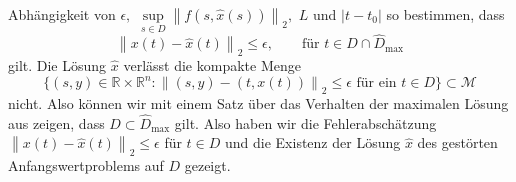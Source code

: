 Abhängigkeit von $\epsilon,$ $\sup\limits_{s \in D}\left\lVert f(s,\hat{x}(s))\right\rVert_2,$  $L$ und $|t-t_0|$ so
bestimmen, dass
\[
    \left\lVert x(t) - \hat{x}(t) \right\rVert_2 \leq \epsilon, \qquad \text{für } t \in D \cap \hat{D}_{\text{max}}
\]
gilt. Die Lösung $\hat{x}$ verlässt die kompakte Menge
\[
    \{(s,y) \in \mathbb{R} \times \mathbb{R}^n: \left\lVert (s,y) - (t,x(t)) \right\rVert_2 \leq \epsilon
    \text{ für ein } t \in D \} \subset \mathcal{M}
\]
nicht. Also können wir mit einem Satz über das Verhalten der maximalen Lösung aus
\cite[Satz 3.21]{beckGewohnlicheDifferentialgleichungen2018} zeigen, dass $D \subset \hat{D}_{\text{max}}$ gilt.
Also haben wir die Fehlerabschätzung $\left\lVert x(t) - \hat{x}(t) \right\rVert_2 \leq \epsilon$
für $t \in D$ und die Existenz der Lösung $\hat{x}$ des gestörten Anfangswertproblems auf $D$ gezeigt. \qedwhite
\newpage